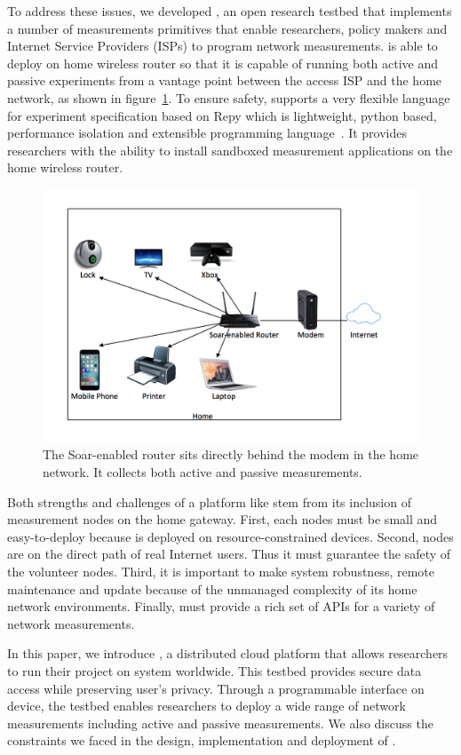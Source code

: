 To address these issues, we developed \sysname, an open research testbed that implements a number of measurements primitives that enable researchers, policy makers and Internet Service Providers (ISPs) to program network measurements. \sysname is able to deploy on home wireless router so that it is capable of running both active and passive experiments from a vantage point between the access ISP and the home network, as shown in figure~\ref{figure:design}. To ensure safety, \sysname supports a very flexible language for experiment specification based on Repy which is lightweight, python based, performance isolation and extensible programming language~\cite{cappos2010retaining}. It provides researchers with the ability to install sandboxed measurement applications on the home wireless router. 

\begin{figure}%
\centering
\includegraphics[width=0.8\columnwidth]{figure/home-network.png}
\caption{The Soar-enabled router sits directly behind the modem in the home network. It collects both active and passive measurements.}
\label{figure:design}
\end{figure}

Both strengths and challenges of a platform like \sysname stem from 
its inclusion of measurement nodes on the home gateway. First, each nodes 
must be small and easy-to-deploy because \sysname is deployed on resource-constrained devices. Second, \sysname nodes are on the direct path of real 
Internet users. Thus it must guarantee the safety of the volunteer nodes. 
Third, it is important to make system robustness, remote maintenance and 
update because of the unmanaged complexity of its home network environments. 
Finally, \sysname must provide a rich set of APIs for a variety of network 
measurements.

In this paper, we introduce \sysname, a distributed cloud platform that allows researchers to run their project on system worldwide. This testbed provides secure data access while preserving user's privacy. Through a programmable interface on device, the testbed enables researchers to deploy a wide range of network measurements including active and passive measurements. We also discuss the constraints we faced in the design, implementation and deployment of \sysname. 

